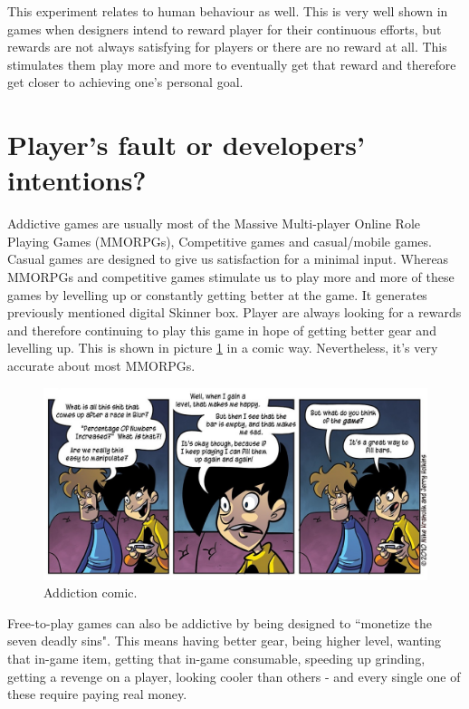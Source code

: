 \documentclass{scrartcl}
\begin{document}
This experiment relates to human behaviour as well. This is very well shown in games when designers intend to reward player for their continuous efforts, but rewards are not always satisfying for players or there are no reward at all. This stimulates them play more and more to eventually get that reward and therefore get closer to achieving one's personal goal.

\section{Player's fault or developers' intentions?}

Addictive games are usually most of the Massive Multi-player Online Role Playing Games (MMORPGs), Competitive games and casual/mobile games. Casual games are designed to give us satisfaction for a minimal input\cite{vgaddiction}. Whereas MMORPGs and competitive games stimulate us to play more and more of these games by levelling up or constantly getting better at the game. It generates previously mentioned digital Skinner box. Player are always looking for a rewards and therefore continuing to play this game in hope of getting better gear and levelling up. This is shown in picture \ref{fig:comic} in a comic way. Nevertheless, it's very accurate about most MMORPGs.

\begin{figure}
  \includegraphics[width=\linewidth]{Images/AddictionComic.jpg}
  \caption{Addiction comic.}
  \label{fig:comic}
\end{figure}

Free-to-play games can also be addictive by being designed to ``monetize the seven deadly sins"\cite{vgaddiction}. This means having better gear, being higher level, wanting that in-game item, getting that in-game consumable, speeding up grinding, getting a revenge on a player, looking cooler than others - and every single one of these require paying real money. 
\end{document}
